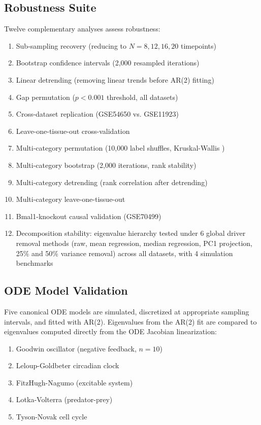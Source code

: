 \documentclass[11pt,letterpaper]{article}
\begin{document}
\subsection{Robustness Suite}

Twelve complementary analyses assess robustness:
\begin{enumerate}
\item Sub-sampling recovery (reducing to $N = 8, 12, 16, 20$ timepoints)
\item Bootstrap confidence intervals (2,000 resampled iterations)
\item Linear detrending (removing linear trends before AR(2) fitting)
\item Gap permutation ($p < 0.001$ threshold, all datasets)
\item Cross-dataset replication (GSE54650 vs. GSE11923)
\item Leave-one-tissue-out cross-validation
\item Multi-category permutation (10,000 label shuffles, Kruskal-Wallis \citep{kruskal1952use})
\item Multi-category bootstrap (2,000 iterations, rank stability)
\item Multi-category detrending (rank correlation after detrending)
\item Multi-category leave-one-tissue-out
\item Bmal1-knockout causal validation (GSE70499)
\item Decomposition stability: eigenvalue hierarchy tested under 6 global driver removal methods (raw, mean regression, median regression, PC1 projection, 25\% and 50\% variance removal) across all datasets, with 4 simulation benchmarks
\end{enumerate}

\subsection{ODE Model Validation}

Five canonical ODE models are simulated, discretized at appropriate sampling intervals, and fitted with AR(2). Eigenvalues from the AR(2) fit are compared to eigenvalues computed directly from the ODE Jacobian linearization:
\begin{enumerate}
\item Goodwin oscillator (negative feedback, $n = 10$) \citep{goodwin1965oscillatory}
\item Leloup-Goldbeter circadian clock \citep{leloup2003toward}
\item FitzHugh-Nagumo (excitable system) \citep{fitzhugh1961impulses}
\item Lotka-Volterra (predator-prey) \citep{lotka1925elements}
\item Tyson-Novak cell cycle \citep{tyson2001regulation}
\end{enumerate}
\end{document}
